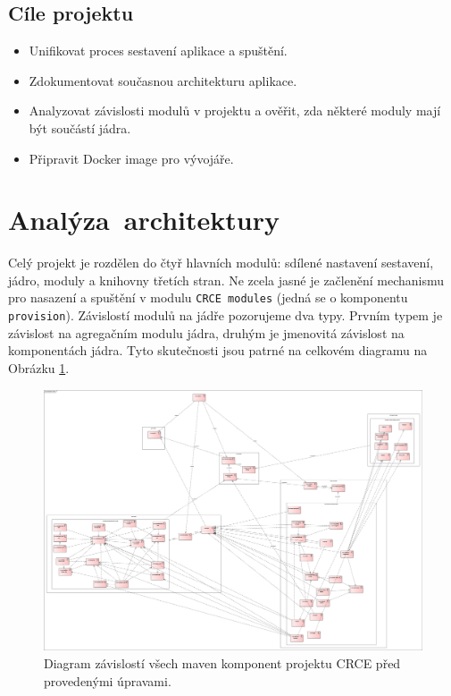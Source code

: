 \documentclass[12pt, a4paper]{article}
\begin{document}
\subsection{Cíle projektu}

\begin{itemize}
	\item Unifikovat proces sestavení aplikace a spuštění.
	\item Zdokumentovat současnou architekturu aplikace.
	\item Analyzovat závislosti modulů v projektu a ověřit, zda některé moduly mají být součástí jádra.
	\item Připravit Docker image pro vývojáře.
\end{itemize}

\newpage
\section{Analýza~architektury} %

Celý projekt je rozdělen do čtyř hlavních modulů: sdílené nastavení sestavení, jádro, moduly a knihovny třetích stran. Ne zcela jasné je začlenění mechanismu pro nasazení a spuštění v modulu \texttt{CRCE modules} (jedná se o komponentu \texttt{provision}). Závislostí modulů na jádře pozorujeme dva typy. Prvním typem je závislost na agregačním modulu jádra, druhým je jmenovitá závislost na komponentách jádra. Tyto skutečnosti jsou patrné na celkovém diagramu na Obrázku \ref{fig:wholeCRCE}.

\begin{figure}[h!]
\centering
\includegraphics[width=135mm]{wholeCRCE.png}
\caption{Diagram závislostí všech maven komponent projektu CRCE před provedenými úpravami.}
\label{fig:wholeCRCE}
\end{figure}
\end{document}
